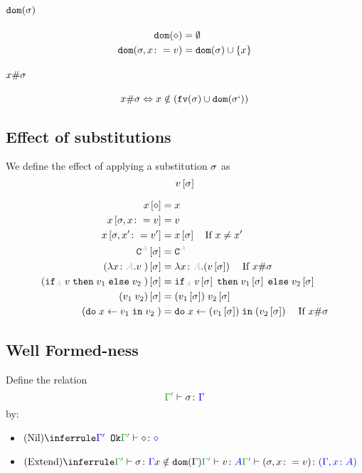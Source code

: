 \documentclass{report}
\begin{document}
\paragraph{$\texttt{dom}(\sigma)$}
\begin{align*}
    \texttt{dom}(\diamond) & = \emptyset\\
    \texttt{dom}(\sigma, x\colon= v) & = \texttt{dom}(\sigma)\cup\left\{x\right\}
\end{align*}

\paragraph{$x \# \sigma$}
\begin{equation}
    x \# \sigma \Leftrightarrow x\notin(\texttt{fv}(\sigma)\cup\texttt{dom}(\sigma`))
\end{equation}

\subsection{Effect of substitutions}
    We define the effect of applying a substitution $\sigma$ as 
    $$v\left[\sigma\right]$$

    
    \begin{align*}
        x\sub{\nil} & = x \\
        x\sub{\si,x\setto v} & = v \\
        x\sub{\si,x'\setto v'} & = x\ssi\qt{If }x \neq x'\\
        \const{A}\ssi & = \const{A} \\
        (\lam{x}{A}{v})\ssi &= \lam{x}{A}{(v\ssi)}\qt{If }x\#\si\\
        (\pifthenelse{A}{v}{v_1}{v_2})\ssi &= \pifthenelse{A}{v\ssi}{v_1\ssi}{v_2\ssi}\\
        (\apply{v_1}{v_2})\ssi&= \apply{(v_1\ssi)}{v_2\ssi}\\
        (\doin{x}{v_1}{v_2})&= \doin{x}{(v_1\ssi)}{(v_2\ssi)}\qt{If } x\#\si\\
    \end{align*}
\subsection{Well Formed-ness}
Define the relation $$\typerelation{\G'}{\si}{\G}$$ by:

\begin{itemize}
    \item $\ntreeruleI{Nil}{\ok{\G'}}{\typerelation{\G'}{\nil}{\nil}}$
    \item $\ntreeruleIII{Extend}{
        \typerelation{\G'}{\si}{\G}
        }{
        x\notin\dom{\G}
        }{
        \typerelation{\G'}{v}{A}
    }{
        \typerelation{\G'}{(\si, x \setto v)}{(\gax)}
    }$
\end{itemize}
\end{document}
